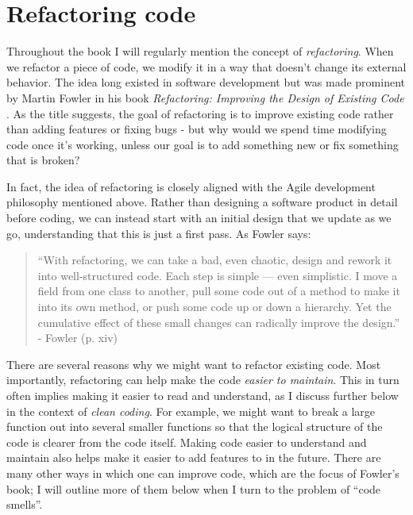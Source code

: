 \section{Refactoring code}

Throughout the book I will regularly mention the concept of \textit{refactoring}.
When we refactor a piece of code, we modify it in a way that doesn't change its external behavior.
The idea long existed in software development but was made prominent by Martin Fowler in his book \textit{Refactoring: Improving the Design of Existing Code} \citep{Fowler:1999aa}.
As the title suggests, the goal of refactoring is to improve existing code rather than adding features or fixing bugs - but why would we spend time modifying code once it's working, unless our goal is to add something new or fix something that is broken?

In fact, the idea of refactoring is closely aligned with the Agile development philosophy mentioned above. 
Rather than designing a software product in detail before coding, we can instead start with an initial design that we update as we go, understanding that this is just a first pass.
As Fowler says:

\begin{quote}
``With refactoring, we can take a bad, even chaotic, design and rework it into well-structured code.
Each step is simple --- even simplistic.
I move a field from one class to another, pull some code out of a method to make it into its own method, or push some code up or down a hierarchy.
Yet the cumulative effect of these small changes can radically improve the design.'' - Fowler (p. xiv)
\end{quote}

There are several reasons why we might want to refactor existing code.
Most importantly, refactoring can help make the code \textit{easier to maintain}.
This in turn often implies making it easier to read and understand, as I discuss further below in the context of \textit{clean coding}.
For example, we might want to break a large function out into several smaller functions so that the logical structure of the code is clearer from the code itself.
Making code easier to understand and maintain also helps make it easier to add features to in the future.
There are many other ways in which one can improve code, which are the focus of Fowler's book; I will outline more of them below when I turn to the problem of ``code smells''.

